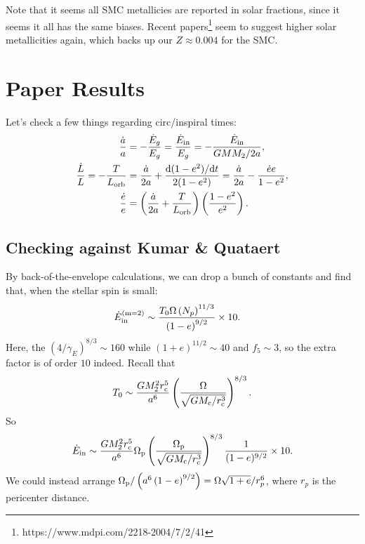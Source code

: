 \documentclass[11pt,
        usenames, %
        dvipsnames %
    ]{article}
\newcommand*{\rdil}[2]{\mathrm{d}#1 / \mathrm{d}#2}
\newcommand*{\p}[1]{\left(#1\right)}
\begin{document}
Note that it seems all SMC metallicies are reported in solar fractions, since it
seems it all has the same biases. Recent papers\footnote{
https://www.mdpi.com/2218-2004/7/2/41} seem to suggest higher solar %
metallicities again, which backs up our $Z \approx 0.004$ for the SMC\@.

\section{Paper Results}

Let's check a few things regarding circ/inspiral times:
\begin{align}
    \frac{\dot{a}}{a} &= - \frac{\dot{E}_g}{E_g}
        = \frac{\dot{E}_{\rm in}}{E_g}
        = -\frac{\dot{E}_{\rm in}}{GMM_2 / 2a},\\
    \frac{\dot{L}}{L} = -\frac{T}{L_{\rm orb}} &= \frac{\dot{a}}{2a}
        + \frac{\rdil{(1 - e^2)}{t}}{2(1 - e^2)}
        = \frac{\dot{a}}{2a} - \frac{\dot{e}e}{1 - e^2},\\
    \frac{\dot{e}}{e} &= \p{\frac{\dot{a}}{2a} + \frac{T}{L_{\rm orb}}}
        \p{\frac{1 - e^2}{e^2}}.
\end{align}

\subsection{Checking against Kumar \& Quataert}

By back-of-the-envelope calculations, we can drop a bunch of constants and find
that, when the stellar spin is small:
\begin{align}
    \dot{E}_{\rm in}^{\rm (m=2)} &\sim
        \frac{T_0 \Omega \p{N_p}^{11/3}}{\p{1 - e}^{9/2}} \times 10.
\end{align}
Here, the $\p{4 / \gamma_{E}}^{8/3} \sim 160$ while $(1 + e)^{11/2} \sim 40$ and
$f_5 \sim 3$, so the extra factor is of order $10$ indeed. Recall that
\begin{equation}
    T_0 \sim \frac{GM_2^2r_{\rm c}^5}{a^6}\p{\frac{\Omega}{\sqrt{G M_{\rm c} / r_{\rm
        c}^3}}}^{8/3}.
\end{equation}
So
\begin{equation}
    \dot{E}_{\rm in} \sim \frac{GM_2^2r_{\rm c}^5}{a^6}\Omega_{\rm
        p}\p{\frac{\Omega_{\rm p}}{\sqrt{GM_{\rm c} / r_{\rm c}^3}}}^{8/3}
        \frac{1}{(1 - e)^{9/2}} \times 10.
\end{equation}
We could instead arrange $\Omega_{\rm p} / \p{a^6\p{1 - e}^{9/2}} =
\Omega\sqrt{1 + e} / r_p^6$, where $r_p$ is the pericenter distance.
\end{document}
